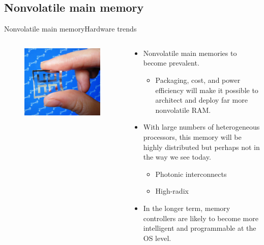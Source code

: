 \documentclass[10pt]{beamer}
\begin{document}
\subsection{Nonvolatile main memory}
\begin{frame}{Nonvolatile main memory}{Hardware trends}
  \begin{columns}[T] %
    \begin{column}{.2\textwidth}
      \begin{figure}[ht]
        \includegraphics[width=1.8\textwidth, keepaspectratio=true]{images/nvm.jpg}
      \end{figure} \pause
    \end{column}%

    \hfill%
    \begin{column}{.7\textwidth}
      \begin{itemize}
        \item Nonvolatile main memories to become prevalent.
        \begin{itemize}
          \item Packaging, cost, and power efficiency will make it possible to
                architect and deploy far more nonvolatile RAM.\pause
        \end{itemize}
        \item With large numbers of heterogeneous processors, this memory will be
              highly distributed but perhaps not in the way we see today.\pause
          \begin{itemize}
            \item Photonic interconnects
            \item High-radix
          \end{itemize}\pause
        \item In the longer term, memory controllers are likely to become more
              intelligent and programmable at the OS level.
      \end{itemize}
    \end{column}%
\end{columns}
\end{frame}
\end{document}
